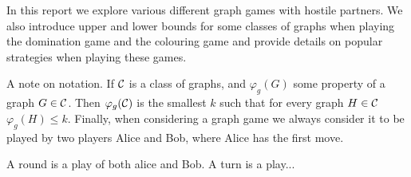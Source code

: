 In this report %
we explore various different graph games with hostile partners. We also introduce upper and lower bounds for some classes of graphs when playing the domination game and the colouring game and provide details on popular strategies when playing these games.






  
    
A note on notation. If $\mathcal{C}$ is a class of graphs, and $\varphi_g(G)$ some property of a graph $G \in \mathcal{C}$. Then $\varphi_g(\mathcal{C})$ is the smallest $k$ such that for every graph $H\in\mathcal{C}$ $\varphi_g(H)\leq k$. Finally, when considering a graph game we always consider it to be played by two players Alice and Bob, where Alice has the first move.  

A round is a play of both alice and Bob. A turn is a play... %


    
    
    
    
    
    
    
    
    
    
    
    
    
    
    
    
    
    
    
    
    